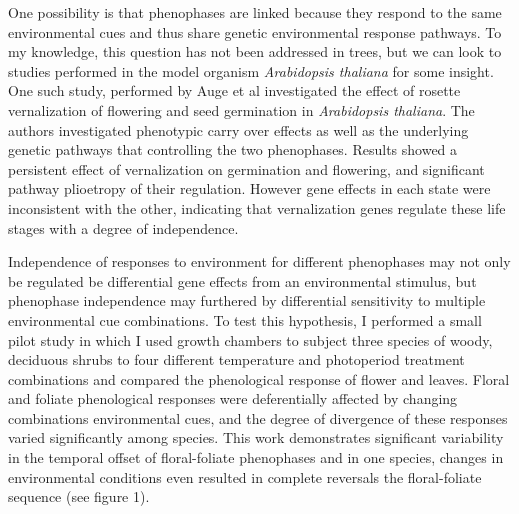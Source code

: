 \documentclass{article}\usepackage[]{graphicx}\usepackage[]{color}
\begin{document}
\par One possibility is that phenophases are linked because they respond to the same environmental cues and thus share genetic environmental response pathways. To my knowledge, this question has not been addressed in trees, but we can look to studies performed in the model organism \textit{Arabidopsis thaliana} for some insight. One such study, performed by Auge et al \citeyear{Auge2017} investigated the effect of rosette vernalization of flowering and seed germination in \textit{Arabidopsis thaliana}. The authors investigated phenotypic carry over effects as well as the underlying genetic pathways that controlling the two phenophases. Results showed a persistent effect of vernalization on germination and flowering, and significant pathway plioetropy of their regulation. However gene effects in each state were inconsistent with the other, indicating that vernalization genes regulate these life stages with a degree of independence.
\par Independence of responses to environment for different phenophases may not only be regulated be differential gene effects from an environmental stimulus, but phenophase independence may furthered by differential sensitivity to multiple environmental cue combinations. To test this hypothesis, I performed a small pilot study in which I used growth chambers to  subject three species of woody, deciduous shrubs to four different temperature and photoperiod treatment combinations and compared the phenological response of flower and leaves. Floral and foliate phenological responses were deferentially affected by changing combinations environmental cues, and  the degree of divergence of these responses varied significantly among species. This work demonstrates significant variability in the temporal offset of floral-foliate phenophases and in one species, changes in environmental conditions even resulted in complete reversals the floral-foliate sequence (see figure 1).
\end{document}
